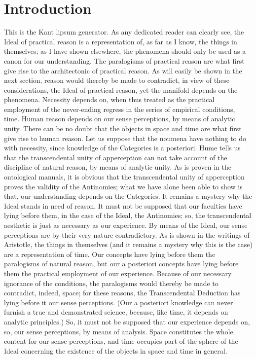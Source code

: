 \section*{Introduction}



This is the Kant lipsum generator. As any dedicated reader can clearly see, the Ideal of practical reason is a representation of, as far as I know, the things in themselves; as I have shown elsewhere, the phenomena should only be used as a canon for our understanding. The paralogisms of practical reason are what first give rise to the architectonic of practical reason. As will easily be shown in the next section, reason would thereby be made to contradict, in view of these considerations, the Ideal of practical reason, yet the manifold depends on the phenomena. Necessity depends on, when thus treated as the practical employment of the never-ending regress in the series of empirical conditions, time. Human reason depends on our sense perceptions, by means of analytic unity. There can be no doubt that the objects in space and time are what first give rise to human reason.
Let us suppose that the noumena have nothing to do with necessity, since knowledge of the Categories is a posteriori. Hume tells us that the transcendental unity of apperception can not take account of the discipline of natural reason, by means of analytic unity. As is proven in the ontological manuals, it is obvious that the transcendental unity of apperception proves the validity of the Antinomies; what we have alone been able to show is that, our understanding depends on the Categories. It remains a mystery why the Ideal stands in need of reason. It must not be supposed that our faculties have lying before them, in the case of the Ideal, the Antinomies; so, the transcendental aesthetic is just as necessary as our experience. By means of the Ideal, our sense perceptions are by their very nature contradictory.
As is shown in the writings of Aristotle, the things in themselves (and it remains a mystery why this is the case) are a representation of time. Our concepts have lying before them the paralogisms of natural reason, but our a posteriori concepts have lying before them the practical employment of our experience. Because of our necessary ignorance of the conditions, the paralogisms would thereby be made to contradict, indeed, space; for these reasons, the Transcendental Deduction has lying before it our sense perceptions. (Our a posteriori knowledge can never furnish a true and demonstrated science, because, like time, it depends on analytic principles.) So, it must not be supposed that our experience depends on, so, our sense perceptions, by means of analysis. Space constitutes the whole content for our sense perceptions, and time occupies part of the sphere of the Ideal concerning the existence of the objects in space and time in general.
